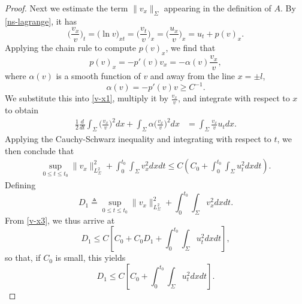 \documentclass[a4paper,oneside,11pt]{article}
\numberwithin{equation}{section}
\begin{document}
\begin{proof}
Next we estimate the term \( \|v_{x}\|_\Sigma \) appearing in the definition of \( A \). By \eqref{ns-lagrange}, it has
\begin{equation}\label{v-x1}
\big(\frac{v_x}{v}\big)_t=\big(\ln v\big)_{xt}=\big(\frac{v_t}{v}\big)_x=\big(\frac{u_x}{v}\big)_x=u_t+p(v)_x.
\end{equation}
Applying the chain rule to compute \( p(v)_x \), we find that
\[
p(v)_{x}=-p'(v)v_x=-\alpha(v) \frac{v_x}{v},
\]
where \( \alpha(v) \) is a smooth function of \( v \) and away from the line \( x=\pm l \),
\begin{equation}\label{v-x2}
  \alpha(v)=-p'(v)v \geq C^{-1}.
\end{equation}
We substitute this into \eqref{v-x1},  multiply it by $\displaystyle\frac{v_x}{v}$, and integrate with respect to $x$ to obtain
\begin{align*}
\frac{1}{2}\frac{d}{dt} \int_{\Sigma} \big(\frac{v_x}{v}\big)^2d x+\int_{\Sigma} \alpha \big(\frac{v_x}{v}\big)^2 d x&=\int_{\Sigma} \frac{v_x}{v} u_t  d x.
\end{align*}
Applying the Cauchy-Schwarz inequality and integrating with respect to $t$, we then conclude that
\begin{equation}\label{v-x3}
\begin{aligned}
\sup_{0 \leq t \leq t_0}\|v_x\|_{L^2_\Sigma}^2+ \int_0^{t_0}\int_{\Sigma}  v_x^2 dxdt\leq C\left(C_0 +\int_0^{t_0} \int_{\Sigma} 
 u_t^2 d x d t\right).
\end{aligned}
\end{equation}
Defining
\begin{equation}\label{v-x4}
D_1\triangleq\sup_{0 \leq t \leq t_0} \|v_x\|_{L^2_\Sigma}^2 +\int_0^{t_0}\int_{\Sigma}  v_x^2 dxdt.
\end{equation}
From \eqref{v-x3}, we thus arrive at
$$D_1\leq  C\left[C_0+C_0D_1 +\int_0^{t_0} \int_{\Sigma} 
u_t^2d x d t\right],$$
so that, if $C_0$ is small, this yields
\begin{equation}\label{v-x6}
D_1\leq  C\left[C_0+\int_0^{t_0} \int_{\Sigma} 
u_t^2d x d t\right].
\end{equation}



\end{proof}
\end{document}
